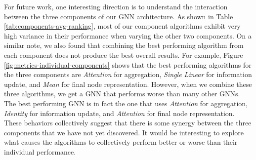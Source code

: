 \documentclass{article}
\begin{document}
For future work, one interesting direction is to understand the interaction between the three components of our GNN architecture. As shown in Table \ref{tab:components-avg-ranking}, most of our component algorithms exhibit very high variance in their performance when varying the other two components. On a similar note, we also found that combining the best performing algorithm from each component does not produce the best overall results. For example, Figure \ref{fig:metrics-individual-components} shows that the best performing algorithms for the three components are \textit{Attention} for aggregation, \textit{Single Linear} for information update, and \textit{Mean} for final node representation. However, when we combine these three algorithms, we get a GNN that performs worse than many other GNNs. The best performing GNN is in fact the one that uses \textit{Attention} for aggregation, \textit{Identity} for information update, and \textit{Attention} for final node representation. These behaviors collectively suggest that there is some synergy between the three components that we have not yet discovered. It would be interesting to explore what causes the algorithms to collectively perform better or worse than their individual performance.




\end{document}
